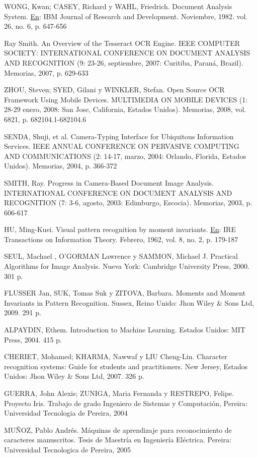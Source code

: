 \documentclass[a4paper, 12pt, oneside]{article}
\begin{document}
	WONG, Kwan; CASEY, Richard y WAHL, Friedrich. Document Analysis System. \underline{En}: IBM Journal of Research and Development. Noviembre, 1982. vol. 26, no. 6, p. 647-656
	
	Ray Smith. An Overview of the Tesseract OCR Engine. IEEE COMPUTER SOCIETY: INTERNATIONAL CONFERENCE ON DOCUMENT ANALYSIS AND RECOGNITION (9: 23-26, septiembre, 2007: Curitiba, Paraná, Brazil). Memorias, 2007, p. 629-633
	
	ZHOU, Steven; SYED, Gilani y WINKLER, Stefan. Open Source OCR Framework Using Mobile Devices. MULTIMEDIA ON MOBILE DEVICES (1: 28-29 enero, 2008: San Jose, California, Estados Unidos). Memorias, 2008, vol. 6821, p. 682104.1-682104.6
	
	SENDA, Shuji, et al. Camera-Typing Interface for Ubiquitous Information Services. IEEE ANNUAL CONFERENCE ON PERVASIVE COMPUTING AND COMMUNICATIONS (2: 14-17, marzo, 2004: Orlando, Florida, Estados Unidos). Memorias, 2004, p. 366-372
	
	SMITH, Ray. Progress in Camera-Based Document Image Analysis. INTERNATIONAL CONFERENCE ON DOCUMENT ANALYSIS AND RECOGNITION (7: 3-6, agosto, 2003: Edimburgo, Escocia). Memorias, 2003, p. 606-617
	
	HU, Ming-Kuei. Visual pattern recognition by moment invariants. \underline{En}: IRE Transactions on Information Theory. Febrero, 1962, vol. 8, no. 2, p. 179-187
	
	SEUL, Machael , O'GORMAN Lawrence y SAMMON, Michael J. Practical Algorithms for Image Analysis. Nueva York: Cambridge University Press, 2000. 301 p.
	
	FLUSSER Jan, SUK, Tomas Suk y ZITOVA, Barbara. Moments and Moment Invariants in Pattern Recognition. Sussex, Reino Unido: Jhon Wiley \& Sons Ltd, 2009. 291 p.
	
	ALPAYDIN, Ethem. Introduction to Machine Learning. Estados Unidos: MIT Press, 2004. 415 p.
	
	CHERIET, Mohamed; KHARMA, Nawwaf y LIU Cheng-Lin. Character recognition systems: Guide for students and practitioners. New Jersey, Estados Unidos: Jhon Wiley \& Sons Ltd, 2007. 326 p.
	
	GUERRA, John Alexis; ZUNIGA, Maria Fernanda y RESTREPO, Felipe. Proyecto Iris. Trabajo de grado Ingeniero de Sistemas y Computación, Pereira: Universidad Tecnologia de Pereira, 2004
	
	MUÑOZ, Pablo Andrés. Máquinas de aprendizaje para reconocimiento de caracteres manuscritos. Tesis de Maestría en Ingeniería Eléctrica. Pereira: Universidad Tecnologica de Pereira, 2005
	
\end{document}
